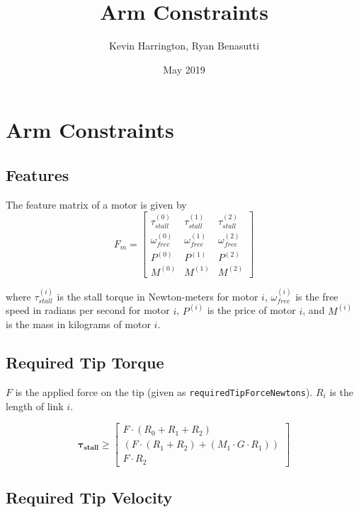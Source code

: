 \documentclass{article}
\title{Arm Constraints}
\author{Kevin Harrington, Ryan Benasutti}
\date{May 2019}
\begin{document}
\maketitle

\FloatBarrier
\section{Arm Constraints}

\FloatBarrier
\subsection{Features}

The feature matrix of a motor is given by
\begin{equation}
    F_m =
    \begin{bmatrix}
        \tau_{stall}^{(0)} & \tau_{stall}^{(1)} & \tau_{stall}^{(2)} \\[6pt]
        \omega_{free}^{(0)} & \omega_{free}^{(1)} & \omega_{free}^{(2)} \\[6pt]
        P^{(0)} & P^{(1)} & P^{(2)} \\[6pt]
        M^{(0)} & M^{(1)} & M^{(2)}
    \end{bmatrix}
\end{equation}

where $\tau_{stall}^{(i)}$ is the stall torque in Newton-meters for motor $i$, $\omega_{free}^{(i)}$
is the free speed in radians per second for motor $i$, $P^{(i)}$ is the price of motor $i$, and
$M^{(i)}$ is the mass in kilograms of motor $i$.

\FloatBarrier
\subsection{Required Tip Torque}

$F$ is the applied force on the tip (given as \texttt{requiredTipForceNewtons}). $R_i$ is the length
of link $i$.

\begin{equation}
    \boldsymbol{\tau_{stall}}
    \geq
    \begin{bmatrix}
        F \cdot (R_0 + R_1 + R_2) \\
        (F \cdot (R_1 + R_2) + (M_1 \cdot G \cdot R_1)) \\
        F \cdot R_2
    \end{bmatrix}
\end{equation}

\FloatBarrier
\subsection{Required Tip Velocity}
\end{document}
